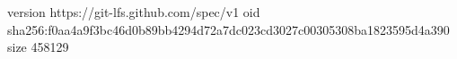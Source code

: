 version https://git-lfs.github.com/spec/v1
oid sha256:f0aa4a9f3bc46d0b89bb4294d72a7dc023cd3027c00305308ba1823595d4a390
size 458129
